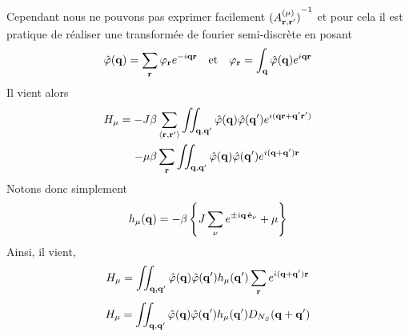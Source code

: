 \documentclass[10pt]{article}
\begin{document}
\begin{multicols}{2}
Cependant nous ne pouvons pas exprimer facilement ${(A_{{\bf r}, {\bf r}'}^{(\mu)})}^{-1}$ et pour cela il est pratique de réaliser une transformée de fourier semi-discrète en posant
\begin{equation}
  \hat{\varphi}({\bf q}) = \sum_{\bf r} \varphi_{\bf r} e^{-i{\bf q}{\bf r}} \quad \text{et} \quad \varphi_{\bf r} = \int_{\bf q} \hat{\varphi}({\bf q})  e^{i{\bf q}{\bf r}}
\end{equation}
Il vient alors
\begin{equation}
\begin{split}
  H_\mu = -J\beta & \sum_{\left<{\bf r}, {\bf r}'\right>} \iint_{{\bf q},{\bf q}'} \hat{\varphi}({\bf q}) \hat{\varphi}({\bf q}')  e^{i({\bf q}{\bf r}+{\bf q}'{\bf r}')} \\
   -\mu\beta & \sum_{\bf r} \iint_{{\bf q},{\bf q}'} \hat{\varphi}({\bf q}) \hat{\varphi}({\bf q}')  e^{i({\bf q}+{\bf q}'){\bf r}}
\end{split}
\end{equation}
Notons donc simplement
\begin{equation}
  h_\mu({\bf q}) = -\beta \left\{ J\sum_{\nu} e^{ \pm i {\bf q} \, \hat{\mathbf{e}}_\nu} +\mu \right\} 
\end{equation}
Ainsi, il vient, 
\begin{equation}
  H_\mu =   \iint_{{\bf q},{\bf q}'} \hat{\varphi}({\bf q}) \hat{\varphi}({\bf q}')   h_\mu({\bf q}')   \sum_{{\bf r}}  e^{i({\bf q}+{\bf q}'){\bf r}} \\
\end{equation}
\begin{equation}
  H_\mu =   \iint_{\qv,\qv'} \hat{\varphi}(\qv) \hat{\varphi}(\qv')   h_\mu(\qv')   D_{N_S}(\qv+\qv') \\

\end{equation}
\end{multicols}
\end{document}
